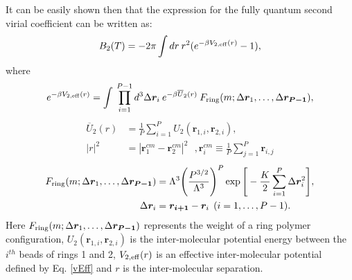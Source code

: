             It can be easily shown \cite{Garberoglio2009} then that the expression for the fully quantum second virial coefficient can be written as:
            \begin{equation} \label{B2}
                B_2 (T) = -2 \pi \displaystyle\int dr\: r^2 (e^{-\beta V_{2,\rm{eff}} (r)} - 1),
            \end{equation}
            where
            \begin{equation} \label{vEff}
                e^{-\beta V_{2,\rm{eff}} (r)} = \displaystyle\int \: \prod\limits_{i=1}^{P-1} d^3 \Delta \bm{r}_i\: e^{-\beta \overline{U}_2 (r)}\: F_{\rm ring} (m; \Delta \bm{r}_1, \ldots , \Delta \bm{r_{P-1}}),
            \end{equation}
            \begin{equation} \label{U2bar}
                \begin{aligned}
                    \overline{U}_2 (r) &= \displaystyle\frac{1}{P} \sum\limits_{i=1}^P U_2 (\bm{r}_{1,i}, \bm{r}_{2,i}),\\
                    |r|^2 &= |\bm{r}^{cm}_1 - \bm{r}^{cm}_2|^2 ~~~, \bm{r}^{cm}_i \equiv \frac{1}{P} \displaystyle\sum\limits_{j=1}^P \bm{r}_{i,j}
                \end{aligned}
            \end{equation}
            \begin{equation} \label{fRing}
                \begin{aligned}
                    F_{\rm ring} (m; \Delta \bm{r}_1, \ldots , \Delta \bm{r_{P-1}}) &= \Lambda^3 \Bigg( \displaystyle\frac{P^{3/2}}{\Lambda^3} \Bigg)^P \exp \Bigg[-\frac{K}{2} \sum\limits_{i=1}^P \Delta \bm{r}_i^2 \Bigg],\\
                    \Delta \bm{r}_i &= \bm{r_{i+1}} - \bm{r}_i \: \: ( i = 1, \ldots, P-1).
                \end{aligned}
            \end{equation}
            Here $F_{\rm ring} (m; \Delta \bm{r}_1, \ldots , \Delta \bm{r_{P-1}})$ represents the weight of a ring polymer configuration, $\allowbreak U_2 (\bm{r}_{1,i}, \bm{r}_{2,i})$ is the inter-molecular potential energy between the $i^{th}$ beads of rings 1 and 2, $V_{2,\rm{eff}} (r)$ is an effective inter-molecular potential defined by Eq. \eqref{vEff} and $r$ is the inter-molecular separation.

